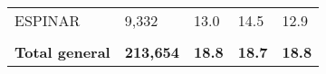 \begin{tabular}{lllll}
	\cellcolor[HTML]{FF5050}ESPINAR                                & 9,332                                                                 & 13.0                                                                             & 14.5                                                                        & 12.9                                                                                \\
	&                                                                       &                                                                                  &                                                                             &                                                                                     \\
	\rowcolor[HTML]{DDEBF7} 
	\textbf{Total   general}                                       & \textbf{213,654}                                                      & \textbf{18.8}                                                                    & \textbf{18.7}                                                               & \textbf{18.8}                                                                      
\end{tabular}